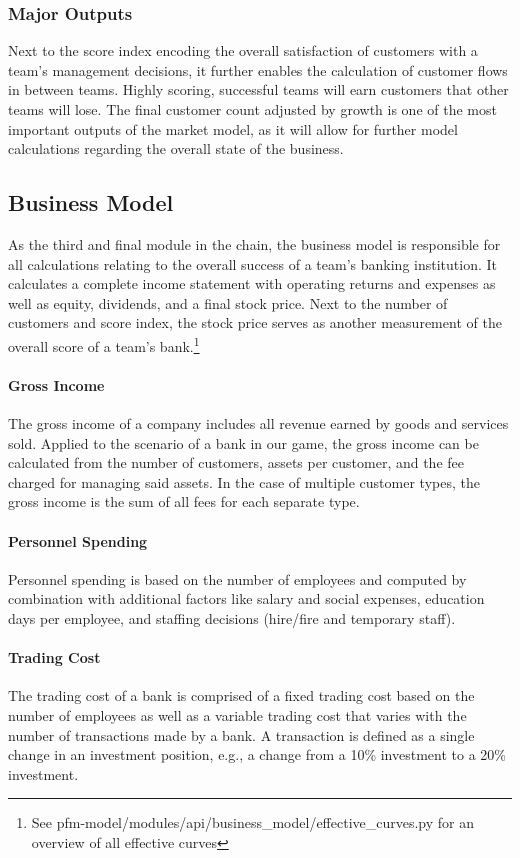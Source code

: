 \subsubsection{Major Outputs}
Next to the score index encoding the overall satisfaction of customers with a team's management decisions, it further enables the calculation of customer flows in between teams. Highly scoring, successful teams will earn customers that other teams will lose. The final customer count adjusted by growth is one of the most important outputs of the market model, as it will allow for further model calculations regarding the overall state of the business.


\subsection{Business Model}
As the third and final module in the chain, the business model is responsible for all calculations relating to the overall success of a team's banking institution. It calculates a complete income statement with operating returns and expenses as well as equity, dividends, and a final stock price. Next to the number of customers and score index, the stock price serves as another measurement of the overall score of a team's bank.\footnote{See pfm-model/modules/api/business\_model/effective\_curves.py for an overview of all effective curves}

\paragraph{Gross Income}
The gross income of a company includes all revenue earned by goods and services sold. Applied to the scenario of a bank in our game, the gross income can be calculated from the number of customers, assets per customer, and the fee charged for managing said assets. In the case of multiple customer types, the gross income is the sum of all fees for each separate type.

\paragraph{Personnel Spending}
Personnel spending is based on the number of employees and computed by combination with additional factors like salary and social expenses, education days per employee, and staffing decisions (hire/fire and temporary staff).

\paragraph{Trading Cost}
The trading cost of a bank is comprised of a fixed trading cost based on the number of employees as well as a variable trading cost that varies with the number of transactions made by a bank. A transaction is defined as a single change in an investment position, e.g., a change from a 10\% investment to a 20\% investment.

